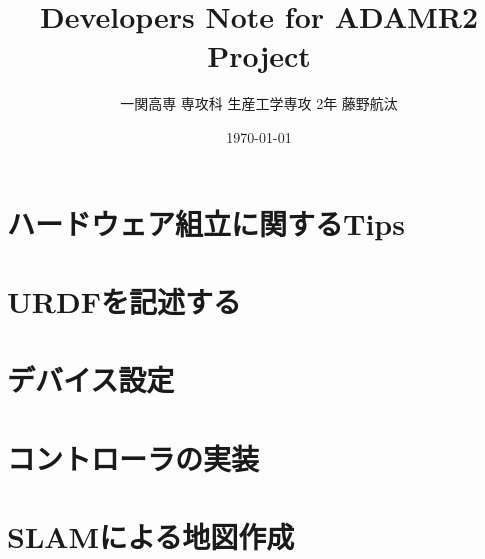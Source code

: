 \documentclass[uplatex, a4paper]{jsreport}
\title{\Huge Developers Note for ADAMR2 Project}
\author{一関高専 専攻科 生産工学専攻 2年 藤野航汰}
\date{\today}
\begin{document}
\maketitle  %

\tableofcontents  %
\newpage

\chapter{ハードウェア組立に関するTips}


\chapter{URDFを記述する}









\chapter{デバイス設定}



\chapter{コントローラの実装}
\label{chap:controller_implementation}










\chapter{SLAMによる地図作成}







\end{document}
